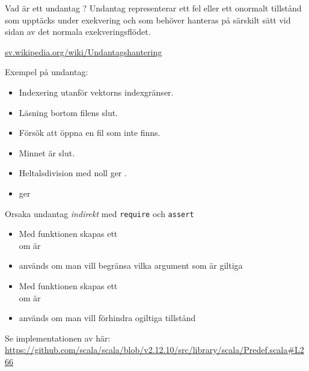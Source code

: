 \begin{Slide}{Vad är ett undantag ?}
Undantag representerar ett fel eller ett onormalt tillstånd som upptäcks under exekvering och som  behöver hanteras på särskilt sätt vid sidan av det normala exekveringsflödet.

\vspace{1em}\href{https://sv.wikipedia.org/wiki/Undantagshantering}{sv.wikipedia.org/wiki/Undantagshantering}


\vspace{1em} Exempel på undantag:

\pause

\begin{itemize} \SlideFontSmall
\item Indexering utanför vektorns indexgränser.

\item Läsning bortom filens slut.

\item Försök att öppna en fil som inte finns.

\item Minnet är slut.

\item Heltalsdivision med noll ger .

\item {} ger 

\end{itemize}

\end{Slide}


\begin{Slide}{Orsaka undantag \textit{indirekt} med \texttt{require} och \texttt{assert}}

\begin{itemize}\SlideFontSmall
  \item Med funktionen  skapas ett  \\ om  är 
  \item {} används om man vill begränsa vilka argument som är giltiga
  \item Med funktionen  skapas ett  \\ om  är  
  \item {} används om man vill förhindra ogiltiga tillstånd
\end{itemize}
{
  \ifkompendium\else
  \vfill\SlideFontTiny
  \fi
  Se implementationen av  här:\\
\url{https://github.com/scala/scala/blob/v2.12.10/src/library/scala/Predef.scala#L266}
}
\end{Slide}

